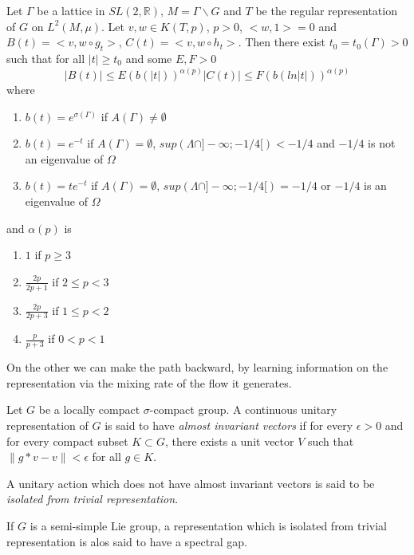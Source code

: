 \begin{thm}
Let $\Gamma$ be a lattice in $SL(2,\mathbb{R})$, $M=\Gamma \backslash G$ and $T$ be the regular representation of $G$ on $L^2 (M, \mu)$. Let $v,w\in K(T,p)$, $p>0$, $<w,1>=0$ and $B(t)=<v,w \circ g_t>$, $C(t)=<v,w \circ h_t>$.
Then there exist $t_0=t_0(\Gamma)>0$ such that for all $|t| \geq t_0$ and some $E,F > 0$\[
|B(t)| \leq E( b(|t|))^{\alpha(p)}
|C(t)| \leq F( b(ln|t|))^{\alpha(p)}
\]
where
\begin{enumerate}
\item $b(t)=e^{\sigma(\Gamma)}$ if $A(\Gamma) \neq \emptyset$
\item $b(t)=e^{-t}$ if $A(\Gamma) = \emptyset$, $sup(\Lambda \cap ]- \infty; -1/4[) < -1/4$ and $-1/4$ is not an eigenvalue of $\Omega$
\item $b(t)=te^{-t}$ if $A(\Gamma) = \emptyset$, $sup(\Lambda \cap ]- \infty; -1/4[)= -1/4$ or $-1/4$ is an eigenvalue of $\Omega$
\end{enumerate}
and $\alpha(p)$ is
\begin{enumerate}
\item $1$ if $p \geq 3$
\item $\frac{2p}{2p+1}$ if $2 \leq p < 3$
\item $\frac{2p}{2p+3}$ if $1 \leq p < 2$
\item $\frac{p}{p+3}$ if $0<p<1$
\end{enumerate}
\end{thm}


On the other we can make the path backward, by learning information on the representation via the mixing rate of the flow it generates.

\begin{dfnt}
Let $G$ be a locally compact $\sigma$-compact group. A continuous unitary
 representation of $G$ is said to have \emph{almost invariant vectors}
 if for every $\epsilon > 0$ and for every compact subset $K \subset G$, there exists a unit vector $V$ such that $\|g*v-v\| < \epsilon$ for all $g \in K$.

 A unitary action which does not have almost invariant vectors is said to be \emph{isolated from trivial representation}.

 If $G$ is a semi-simple Lie group, a representation which is isolated from trivial representation is alos said to have a spectral gap.
\end{dfnt}

